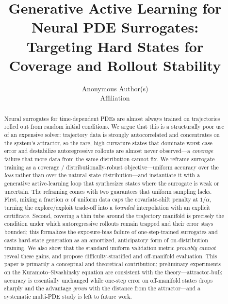 \documentclass{article}
\title{Generative Active Learning for Neural PDE Surrogates:\\
Targeting Hard States for Coverage and Rollout Stability}
\author{Anonymous Author(s)\\ Affiliation}
\date{}
\theoremstyle{plain}
\theoremstyle{definition}
\theoremstyle{remark}
\newcommand{\unif}{\alpha}
\begin{document}
\maketitle

\begin{abstract}
Neural surrogates for time-dependent PDEs are almost always trained on trajectories rolled out from
random initial conditions. We argue that this is a structurally poor use of an expensive solver:
trajectory data is strongly autocorrelated and concentrates on the system's attractor, so the rare,
high-curvature states that dominate worst-case error and destabilize autoregressive rollouts are
almost never observed---a \emph{coverage} failure that more data from the same distribution cannot fix.
We reframe surrogate training as a coverage / distributionally-robust objective---uniform accuracy over
the \emph{loss} rather than over the natural state distribution---and instantiate it with a generative
active-learning loop that synthesizes states where the surrogate is weak or uncertain. The reframing
comes with two guarantees that uniform sampling lacks. First, mixing a fraction $\unif$ of uniform data
caps the covariate-shift penalty at $1/\unif$, turning the explore/exploit trade-off into a
\emph{bounded} interpolation with an explicit certificate. Second, covering a thin tube around the
trajectory manifold is precisely the condition under which autoregressive rollouts remain trapped and
their error stays bounded; this formalizes the exposure-bias failure of one-step-trained surrogates and
casts hard-state generation as an amortized, anticipatory form of on-distribution training. We also show
that the standard uniform validation metric \emph{provably cannot} reveal these gains, and propose
difficulty-stratified and off-manifold evaluation. This paper is primarily a conceptual and theoretical
contribution; preliminary experiments on the Kuramoto--Sivashinsky equation are consistent with the
theory---attractor-bulk accuracy is essentially unchanged while one-step error on off-manifold states
drops sharply and the advantage \emph{grows} with the distance from the attractor---and a systematic
multi-PDE study is left to future work.
\end{abstract}

\end{document}
